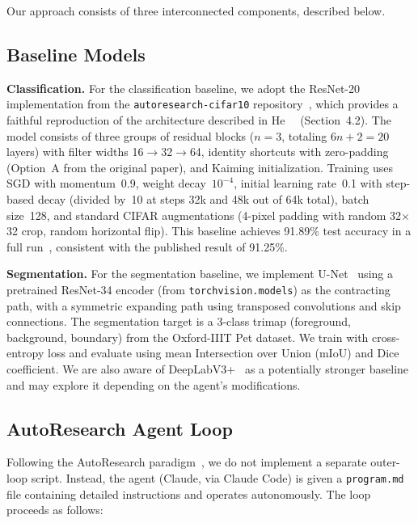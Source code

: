 \documentclass[10pt,twocolumn,letterpaper]{article}
\begin{document}
Our approach consists of three interconnected components, described below.

\subsection{Baseline Models}

\textbf{Classification.} For the classification baseline, we adopt the ResNet-20 implementation from the \texttt{autoresearch-cifar10} repository~\cite{Erhard2025AutoResearchCIFAR}, which provides a faithful reproduction of the architecture described in He~\etal~\cite{He2016ResNet} (Section~4.2). The model consists of three groups of residual blocks ($n=3$, totaling $6n+2=20$ layers) with filter widths 16$\to$32$\to$64, identity shortcuts with zero-padding (Option~A from the original paper), and Kaiming initialization. Training uses SGD with momentum~0.9, weight decay~$10^{-4}$, initial learning rate~0.1 with step-based decay (divided by~10 at steps 32k and 48k out of 64k total), batch size~128, and standard CIFAR augmentations (4-pixel padding with random 32$\times$32 crop, random horizontal flip). This baseline achieves 91.89\% test accuracy in a full run~\cite{Erhard2025AutoResearchCIFAR}, consistent with the published result of 91.25\%.

\textbf{Segmentation.} For the segmentation baseline, we implement U-Net~\cite{Ronneberger2015UNet} using a pretrained ResNet-34 encoder (from \texttt{torchvision.models}) as the contracting path, with a symmetric expanding path using transposed convolutions and skip connections. The segmentation target is a 3-class trimap (foreground, background, boundary) from the Oxford-IIIT Pet dataset. We train with cross-entropy loss and evaluate using mean Intersection over Union (mIoU) and Dice coefficient. We are also aware of DeepLabV3+~\cite{Chen2018DeepLabV3} as a potentially stronger baseline and may explore it depending on the agent's modifications.

\subsection{AutoResearch Agent Loop}

Following the AutoResearch paradigm~\cite{Karpathy2025AutoResearch, Erhard2025AutoResearchCIFAR}, we do not implement a separate outer-loop script. Instead, the agent (Claude, via Claude Code) is given a \texttt{program.md} file containing detailed instructions and operates autonomously. The loop proceeds as follows:
\end{document}
